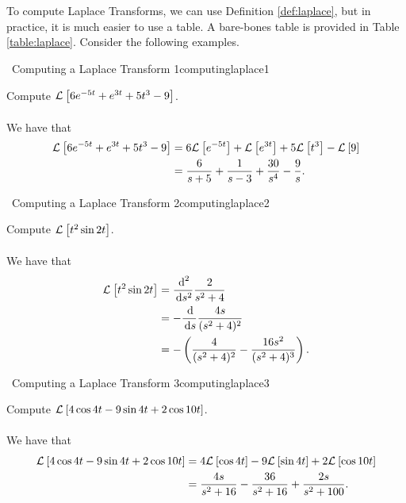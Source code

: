         \pagebreak
        \vphantom
        \\
        \\
        To compute Laplace Transforms, we can use Definition \ref{def:laplace}, but in practice, it is much easier to use a table. A bare-bones table is provided in Table \ref{table:laplace}. Consider the following examples.
        \begin{example}{\Difficulty\,\Difficulty\,\,Computing a Laplace Transform 1}{computinglaplace1}
            
            Compute \(\mathcal{L}^{}\left[6e^{-5t}+e^{3t}+5t^3-9\right]\).
            \\
            \\
            We have that
            \begin{align*}
                \mathcal{L}^{}\left[6e^{-5t}+e^{3t}+5t^3-9\right]&=6\mathcal{L}^{}\left[e^{-5t}\right]+\mathcal{L}^{}\left[e^{3t}\right]+5\mathcal{L}^{}\left[t^3\right]-\mathcal{L}^{}\left[9\right] \\
                &=\frac{6}{s+5}+\frac{1}{s-3}+\frac{30}{s^4}-\frac{9}{s}.
            \end{align*}

        \end{example}
        \begin{example}{\Difficulty\,\Difficulty\,\,Computing a Laplace Transform 2}{computinglaplace2}
            
            Compute \(\mathcal{L}^{}\left[t^2\sin 2t\right]\).
            \\
            \\
            We have that
            \begin{align*}
                \mathcal{L}^{}\left[t^2\sin 2t\right]&=\frac{\,\text{d}^2}{\,\text{d} s^2}\frac{2}{s^2+4} \\
                &=-\frac{\,\text{d}}{\,\text{d} s}\frac{4s}{(s^2+4)^2} \\
                &=-\left(\frac{4}{(s^2+4)^2}-\frac{16s^2}{(s^2+4)^3}\right).
            \end{align*}

        \end{example}
        \begin{example}{\Difficulty\,\Difficulty\,\,Computing a Laplace Transform 3}{computinglaplace3}
            
            Compute \(\mathcal{L}^{}\left[4\cos 4t-9\sin 4t+2\cos 10t\right]\).
            \\
            \\
            We have that
            \begin{align*}
                \mathcal{L}^{}\left[4\cos 4t-9\sin 4t+2\cos 10t\right]&=4\mathcal{L}^{}\left[\cos 4t\right]-9\mathcal{L}^{}\left[\sin 4t\right]+2\mathcal{L}^{}\left[\cos 10 t\right] \\
                &=\frac{4s}{s^2+16}-\frac{36}{s^2+16}+\frac{2s}{s^2+100}.
            \end{align*}

        \end{example}
